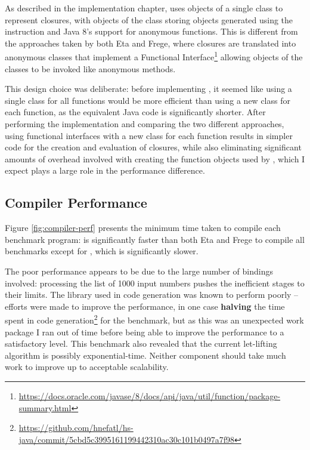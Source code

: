\documentclass[dissertation.tex]{subfiles}
\begin{document}
{{        As described in the implementation chapter, \compilername uses objects of a single class to represent closures, with objects of the class storing  objects generated using the  instruction and Java 8's support for anonymous functions. This is different from the approaches taken by both Eta and Frege, where closures are translated into anonymous classes that implement a Functional Interface\footnote{\url{https://docs.oracle.com/javase/8/docs/api/java/util/function/package-summary.html}} allowing objects of the classes to be invoked like anonymous methods.

        This design choice was deliberate: before implementing \compilername, it seemed like using a single class for all functions would be more efficient than using a new class for each function, as the equivalent Java code is significantly shorter. After performing the implementation and comparing the two different approaches, using functional interfaces with a new class for each function results in simpler code for the creation and evaluation of closures, while also eliminating significant amounts of overhead involved with creating the function objects used by \compilername, which I expect plays a large role in the performance difference.
    }
    \subsection{Compiler Performance}
    {
        Figure \ref{fig:compiler-perf} presents the minimum time taken to compile each benchmark program: \compilername is significantly faster than both Eta and Frege to compile all benchmarks except for , which is significantly slower.
        
        The poor performance appears to be due to the large number of bindings involved: processing the list of 1000 input numbers pushes the inefficient stages to their limits. The  library used in code generation was known to perform poorly -- efforts were made to improve the performance, in one case \textbf{halving} the time spent in code generation\footnote{\url{https://github.com/hnefatl/hs-java/commit/5cbd5c3995161199442310ac30c101b0497a7f98}} for the  benchmark, but as this was an unexpected work package I ran out of time before being able to improve the performance to a satisfactory level. This benchmark also revealed that the current let-lifting algorithm is possibly exponential-time. Neither component should take much work to improve up to acceptable scalability.

}}
\end{document}
